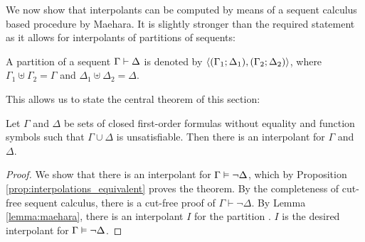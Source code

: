 \begin{comment}
	Suppose $\pi$ contains an instance of \lkrule{w}{r} such that the equality symbolc occurs in the principal formula $A$. 
	Then as it does not occur in the end sequent, it is removed by either an instance of an equality rule or the cut rule. 
	Suppose it is removed via an equality rule. We consider the case of  $\lkrule{=}{l_1}$.
	\begin{prooftree}

		\AxiomCm{\Lambda, A\occurat{t}{p} \proves \Theta}

		\AxiomCm{\varphi}
		\noLine
		\UnaryInfCm{\Gamma \proves \Delta}
		\RightLabelm{\lkrule{w}{r}}
		\UnaryInfCm{\Gamma \proves \Delta, s=t}
		\noLine
		\UnaryInfCm{\vdots}
		\noLine
		\UnaryInfCm{\Sigma \proves \Pi, s=t}

		\RightLabelm{\lkrule{=}{l_1}}                        
		\BinaryInfm{\Lambda, \Sigma, A\occurat{s}{p} \fCenter \Theta, \Pi }
	\end{prooftree}



	TODO


	(proof might become longer, but how does that work? don't innessential cuts remain?)

\end{proof}
\end{comment}


We now show that interpolants can be computed by means of a sequent calculus based procedure by Maehara.
It is slightly stronger than the required statement as it allows for interpolants of partitions of sequents:

\begin{defi}
	A {partition} of a sequent $\Gamma \vdash \Delta$ is denoted by $ \langle (\Gamma_1; \Delta_1), (\Gamma_2; \Delta_2)\rangle $, where
	$\Gamma_1 \uplus \Gamma_2 = \Gamma$ and 
	$\Delta_1 \uplus \Delta_2 = \Delta$.
\end{defi}



This allows us to state the central theorem of this section:
\begin{thm}
	\label{thm:prop_interpol}
	Let $\Gamma$ and $\Delta$ be sets of closed first-order formulas without equality and function symbols such that $\Gamma \cup \Delta$ is unsatisfiable. Then there is an interpolant for $\Gamma$ and~$\Delta$.
\end{thm}
\begin{proof}
	We show that there is an interpolant for $\Gamma \vDash \lnot \Delta$, which
	by Proposition \ref{prop:interpolations_equivalent} proves the theorem.
	By the completeness of cut-free sequent calculus, there is a cut-free proof of $\Gamma \vdash \lnot \Delta$.
	By Lemma \ref{lemma:maehara}, there is an interpolant $I$ for the partition \parti{\Gamma}{}{}{\lnot \Delta}.
	$I$ is the desired interpolant for $\Gamma\vDash\lnot\Delta$.

\end{proof}



